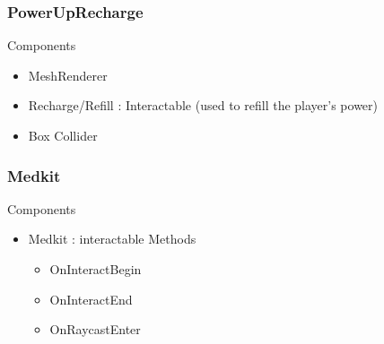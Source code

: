 \documentclass[11pt]{article}
\begin{document}
\subsubsection{PowerUpRecharge}
Components
\begin{itemize}
	\item MeshRenderer
	\item Recharge/Refill : Interactable (used to refill the player’s power)
	\item Box Collider
\end{itemize}

\subsubsection{Medkit}
Components
\begin{itemize}
	\item Medkit : interactable
	\newline Methods
	\begin{itemize}
		\item OnInteractBegin
		\item OnInteractEnd
		\item OnRaycastEnter
	\end{itemize}
\end{itemize}

\newpage
\end{document}
